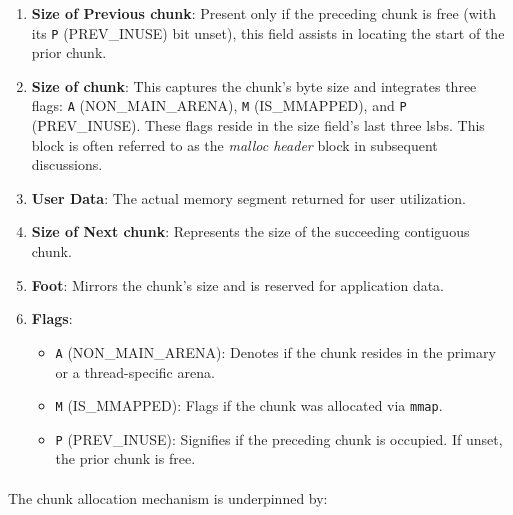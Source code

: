         \begin{enumerate}
            \item \textbf{Size of Previous \gls{chunk}}: Present only if the preceding \gls{chunk} is free (with its \texttt{P} (PREV\_INUSE) bit unset), this field assists in locating the start of the prior \gls{chunk}.
            
            \item \textbf{Size of \gls{chunk}}: This captures the \gls{chunk}'s byte size and integrates three flags: \texttt{A} (NON\_MAIN\_ARENA), \texttt{M} (IS\_MMAPPED), and \texttt{P} (PREV\_INUSE). These flags reside in the size field's last three \acrshort{lsb}s. This block is often referred to as the \textit{malloc header} block in subsequent discussions.
            
            \item \textbf{User Data}: The actual memory segment returned for user utilization.
            
            \item \textbf{Size of Next \gls{chunk}}: Represents the size of the succeeding contiguous \gls{chunk}.
            
            \item \textbf{Foot}: Mirrors the \gls{chunk}'s size and is reserved for application data.
            
            \item \textbf{Flags}:
            \begin{itemize}
                \item \texttt{A} (NON\_MAIN\_ARENA): Denotes if the \gls{chunk} resides in the primary or a thread-specific arena.
                \item \texttt{M} (IS\_MMAPPED): Flags if the \gls{chunk} was allocated via \texttt{mmap}.
                \item \texttt{P} (PREV\_INUSE): Signifies if the preceding \gls{chunk} is occupied. If unset, the prior \gls{chunk} is free.
            \end{itemize}
        \end{enumerate}
        
        \paragraph{}The \gls{chunk} allocation mechanism is underpinned by:
        
